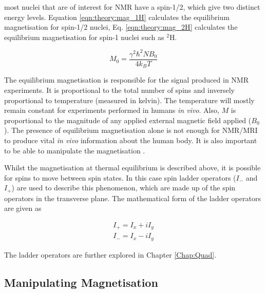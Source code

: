 \noindent most nuclei that are of interest for \ac{NMR} have a spin-1/2, which give two distinct energy levels. Equation \ref{eqn:theory:mag_1H} calculates the equilibrium magnetisation for spin-1/2 nuclei, Eq. \ref{eqn:theory:mag_2H} calculates the equilibrium magnetisation for spin-1 nuclei such as $^2$H.

\begin{equation}
    M_0 = \frac{\gamma^2 \hbar^2 N B_0}{4k_BT}
    \label{eqn:theory:mag_1H}
\end{equation}

The equilibrium magnetisation is responsible for the signal produced in \ac{NMR} experiments. It is proportional to the total number of spins and inversely proportional to temperature (measured in kelvin). The temperature will mostly remain constant for experiments performed in humans \textit{in vivo}. Also, $M$ is proportional to the magnitude of any applied external magnetic field applied ($B_0$). The presence of equilibrium magnetisation alone is not enough for \ac{NMR}/\ac{MRI} to produce vital \textit{in vivo} information about the human body. It is also important to be able to manipulate the magnetisation \cite{Haacke2014MagneticDesign}. 

Whilst the magnetisation at thermal equilibrium is described above, it is possible for spins to move between spin states. In this case spin ladder operators ($I_-$ and $I_+$) are used to describe this phenomenon, which are made up of the spin operators in the transverse plane. The mathematical form of the ladder operators are given as

\begin{equation}
    \begin{gathered}
        I_+ = I_x + iI_y \\
        I_- = I_x - iI_y  
    \end{gathered}    
    \label{eqn:theory:ladder}
\end{equation}

The ladder operators are further explored in Chapter \ref{Chap:Quad}.

\subsection{Manipulating Magnetisation}

\label{Chap:Theory:Magnetisation}

